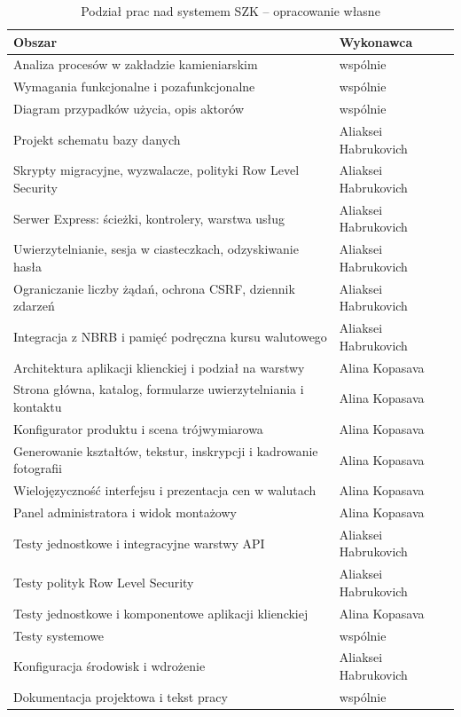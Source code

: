 \begin{table}[htbp]
\centering
\caption{Podział prac nad systemem SZK -- opracowanie własne}
\label{tab:podzial-pracy}
\begin{tabular}{|p{}|p{}|}
\hline
\textbf{Obszar} & \textbf{Wykonawca} \\
\hline
Analiza procesów w zakładzie kamieniarskim & wspólnie \\
\hline
Wymagania funkcjonalne i pozafunkcjonalne & wspólnie \\
\hline
Diagram przypadków użycia, opis aktorów & wspólnie \\
\hline
Projekt schematu bazy danych & Aliaksei Habrukovich \\
\hline
Skrypty migracyjne, wyzwalacze, polityki Row Level Security & Aliaksei Habrukovich \\
\hline
Serwer Express: ścieżki, kontrolery, warstwa usług & Aliaksei Habrukovich \\
\hline
Uwierzytelnianie, sesja w ciasteczkach, odzyskiwanie hasła & Aliaksei Habrukovich \\
\hline
Ograniczanie liczby żądań, ochrona CSRF, dziennik zdarzeń & Aliaksei Habrukovich \\
\hline
Integracja z NBRB i pamięć podręczna kursu walutowego & Aliaksei Habrukovich \\
\hline
Architektura aplikacji klienckiej i podział na warstwy & Alina Kopasava \\
\hline
Strona główna, katalog, formularze uwierzytelniania i kontaktu & Alina Kopasava \\
\hline
Konfigurator produktu i scena trójwymiarowa & Alina Kopasava \\
\hline
Generowanie kształtów, tekstur, inskrypcji i kadrowanie fotografii & Alina Kopasava \\
\hline
Wielojęzyczność interfejsu i prezentacja cen w walutach & Alina Kopasava \\
\hline
Panel administratora i widok montażowy & Alina Kopasava \\
\hline
Testy jednostkowe i integracyjne warstwy API & Aliaksei Habrukovich \\
\hline
Testy polityk Row Level Security & Aliaksei Habrukovich \\
\hline
Testy jednostkowe i komponentowe aplikacji klienckiej & Alina Kopasava \\
\hline
Testy systemowe & wspólnie \\
\hline
Konfiguracja środowisk i wdrożenie & Aliaksei Habrukovich \\
\hline
Dokumentacja projektowa i tekst pracy & wspólnie \\
\hline
\end{tabular}
\end{table}



